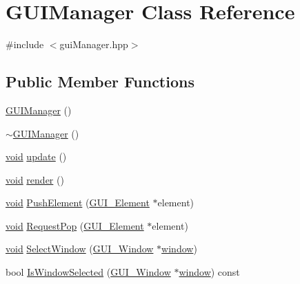 \hypertarget{class_g_u_i_manager}{\section{G\-U\-I\-Manager Class Reference}
\label{class_g_u_i_manager}
}


{\ttfamily \#include $<$gui\-Manager.\-hpp$>$}

\subsection*{Public Member Functions}
\begin{DoxyCompactItemize}
\item 
\hyperlink{class_g_u_i_manager_a5587062fc64af58b9adbe5df4ba25097}{G\-U\-I\-Manager} ()
\item 
\hyperlink{class_g_u_i_manager_a4e1a7873e94f406c1b6cb4c50d3f2aab}{$\sim$\-G\-U\-I\-Manager} ()
\item 
\hyperlink{_s_d_l__opengles2__gl2ext_8h_ae5d8fa23ad07c48bb609509eae494c95}{void} \hyperlink{class_g_u_i_manager_ab13b8c243a5950575c42674365558bcc}{update} ()
\item 
\hyperlink{_s_d_l__opengles2__gl2ext_8h_ae5d8fa23ad07c48bb609509eae494c95}{void} \hyperlink{class_g_u_i_manager_a33fff41b6ac48ca99233c59304869bf6}{render} ()
\item 
\hyperlink{_s_d_l__opengles2__gl2ext_8h_ae5d8fa23ad07c48bb609509eae494c95}{void} \hyperlink{class_g_u_i_manager_a475af471c47fc35b54dd73f38aa7ea6c}{Push\-Element} (\hyperlink{class_g_u_i___element}{G\-U\-I\-\_\-\-Element} $\ast$element)
\item 
\hyperlink{_s_d_l__opengles2__gl2ext_8h_ae5d8fa23ad07c48bb609509eae494c95}{void} \hyperlink{class_g_u_i_manager_a66d3a697ee17d8261174dd22fd784b48}{Request\-Pop} (\hyperlink{class_g_u_i___element}{G\-U\-I\-\_\-\-Element} $\ast$element)
\item 
\hyperlink{_s_d_l__opengles2__gl2ext_8h_ae5d8fa23ad07c48bb609509eae494c95}{void} \hyperlink{class_g_u_i_manager_a951b31fcd1e6c5e9fcc39393e411c52c}{Select\-Window} (\hyperlink{class_g_u_i___window}{G\-U\-I\-\_\-\-Window} $\ast$\hyperlink{jquery_8js_a04a8a2bbfa9c15500892b8e5033d625b}{window})
\item 
bool \hyperlink{class_g_u_i_manager_aee22bffcd6ac8a8022e304845f41a110}{Is\-Window\-Selected} (\hyperlink{class_g_u_i___window}{G\-U\-I\-\_\-\-Window} $\ast$\hyperlink{jquery_8js_a04a8a2bbfa9c15500892b8e5033d625b}{window}) const 
\item 

\end{DoxyCompactItemize}
